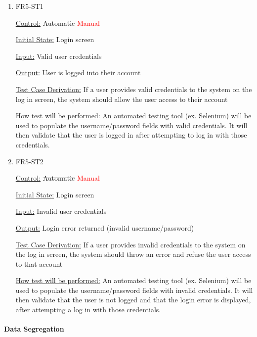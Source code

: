 \documentclass[12pt, titlepage]{article}
\begin{document}
\begin{enumerate}

\item{FR5-ST1\\}

\underline{Control:} \sout{Automatic} \textcolor{red} {Manual}

\underline{Initial State:} Login screen

\underline{Input:} Valid user credentials

\underline{Output:} User is logged into their account

\underline{Test Case Derivation:} If a user provides valid credentials to the system on the log in screen, the system should allow the user access to their account

\underline{How test will be performed:} An automated testing tool (ex. Selenium) will be used to populate the username/password fields with valid credentials. It will then validate that the user is logged in after attempting to log in with those credentials.
					
\item{FR5-ST2\\}

\underline{Control:} \sout{Automatic} \textcolor{red} {Manual}

\underline{Initial State:} Login screen

\underline{Input:} Invalid user credentials

\underline{Output:} Login error returned (invalid username/password)

\underline{Test Case Derivation:} If a user provides invalid credentials to the system on the log in screen, the system should throw an error and refuse the user access to that account

\underline{How test will be performed:} An automated testing tool (ex. Selenium) will be used to populate the username/password fields with invalid credentials. It will then validate that the user is not logged and that the login error is displayed, after attempting a log in with those credentials.

\end{enumerate}

\paragraph{Data Segregation}
\end{document}
